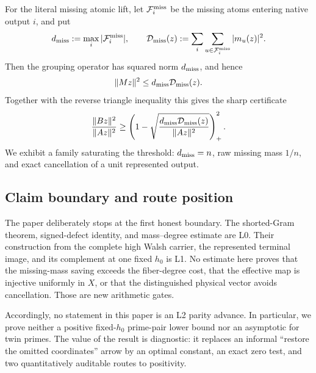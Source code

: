 For the literal missing atomic lift, let \(\mathcal F_i^{\rm miss}\) be the
missing atoms entering native output \(i\), and put
\begin{equation}
 d_{\rm miss}:=\max_i|\mathcal F_i^{\rm miss}|,
 \qquad
 \mathcal D_{\rm miss}(z)
 :=\sum_i\sum_{u\in\mathcal F_i^{\rm miss}}|m_u(z)|^2.
 \label{eq:tpc60-degree-diagonal-intro}
\end{equation}
Then the grouping operator has squared norm \(d_{\rm miss}\), and hence
\begin{equation}
 \|Mz\|^2\le d_{\rm miss}\mathcal D_{\rm miss}(z).
 \label{eq:tpc60-mass-degree-intro}
\end{equation}
Together with the reverse triangle inequality this gives the sharp
certificate
\begin{equation}
 \frac{\|Bz\|^2}{\|Az\|^2}
 \ge
 \left(
  1-\sqrt{\frac{d_{\rm miss}\mathcal D_{\rm miss}(z)}{\|Az\|^2}}
 \right)_+^2.
 \label{eq:tpc60-pointwise-certificate-intro}
\end{equation}
We exhibit a family saturating the threshold: \(d_{\rm miss}=n\), raw
missing mass \(1/n\), and exact cancellation of a unit represented output.

\subsection{Claim boundary and route position}

The paper deliberately stops at the first honest boundary.
The shorted-Gram theorem, signed-defect identity, and mass--degree estimate
are L0.  Their construction from the complete high Walsh carrier,
the represented terminal image, and its complement at one fixed \(h_0\)
is L1.  No estimate here proves that the missing-mass saving exceeds the
fiber-degree cost, that the effective map is injective uniformly in \(X\),
or that the distinguished physical vector avoids cancellation.  Those are
new arithmetic gates.

Accordingly, no statement in this paper is an L2 parity advance.  In
particular, we prove neither a positive fixed-\(h_0\) prime-pair lower bound
nor an asymptotic for twin primes.  The value of the result is diagnostic:
it replaces an informal ``restore the omitted coordinates'' arrow by an
optimal constant, an exact zero test, and two quantitatively auditable
routes to positivity.
